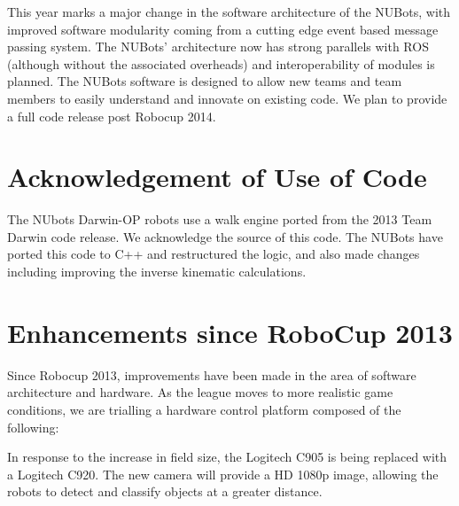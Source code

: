 \documentclass{llncs}
\begin{document}
This year marks a major change in the software architecture of the NUBots, with improved software modularity coming from a cutting edge event based message passing system. The NUBots' architecture now has strong parallels with ROS (although without the associated overheads) and interoperability of modules is planned. The NUBots software is designed to allow new teams and team members to easily understand and innovate on existing code. We plan to provide a full code release post Robocup 2014.




\section{Acknowledgement of Use of Code}
The NUbots Darwin-OP robots use a walk engine ported from the 2013 Team Darwin code release. We acknowledge the source of this code. The NUBots have ported this code to C++ and restructured the logic, and also made changes including improving the inverse kinematic calculations. %

\section{Enhancements since RoboCup 2013}
Since Robocup 2013, improvements have been made in the area of software architecture and hardware. As the league moves to more realistic game conditions, we are trialling a hardware control platform composed of the following:

In response to the increase in field size, the Logitech C905 is being replaced with a Logitech C920. The new camera will provide a HD 1080p image, allowing the robots to detect and classify objects at a greater distance.
\end{document}
